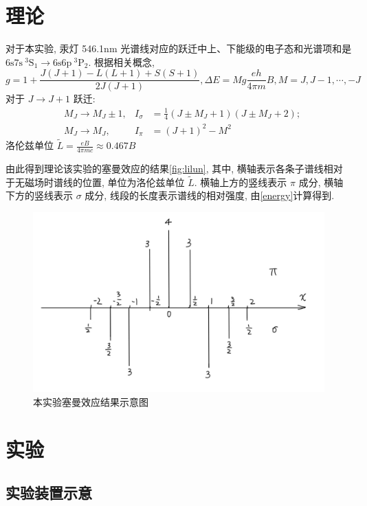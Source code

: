 \documentclass[font=default]{mpltx}
\begin{document}
\section{理论}
对于本实验, 汞灯 546.1nm 光谱线对应的跃迁中上、下能级的电子态和光谱项和是$6\mathrm{s}7\mathrm{s}\ ^3\mathrm{S}_1 \rightarrow 6\mathrm{s}6\mathrm{p}\ ^3\mathrm{P}_2$.
根据相关概念, 
$$ 
g = 1 + \frac{J(J + 1) - L(L + 1) + S(S + 1)}{2J(J + 1)} , \Delta E = Mg\frac{eh}{4\pi m}B , M = J, J - 1, \cdots, -J 
$$
对于 $J \to J+1$ 跃迁:
\begin{equation} \label{energy}
\begin{aligned}
&M_J \to M_J \pm 1, & I_\sigma &= \frac{1}{4}(J \pm M_J + 1)(J \pm M_J + 2); \\
&M_J \to M_J, & I_\pi &= (J+1)^2 - M^2
\end{aligned}
\end{equation}
洛伦兹单位  $\tilde{L} = \frac{eB}{4\pi mc} \approx 0.467B$

由此得到理论该实验的塞曼效应的结果\autoref{fig:lilun}, 
其中, 横轴表示各条子谱线相对于无磁场时谱线的位置, 单位为洛伦兹单位 $\tilde{L}$. 
横轴上方的竖线表示 $\pi$ 成分, 横轴下方的竖线表示 $\sigma$ 成分, 线段的长度表示谱线的相对强度, 由\autoref{energy}计算得到. 

\begin{figure}[htbp]
  \centering
  \includegraphics[width=0.85\linewidth]{fig/lilun.jpg}
  \caption{本实验塞曼效应结果示意图}
  \label{fig:lilun}
\end{figure}


\section{实验}
\subsection{实验装置示意}
\end{document}
